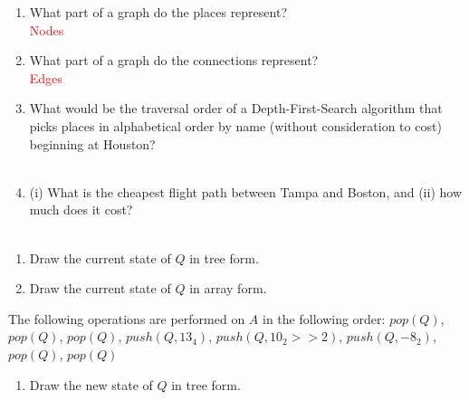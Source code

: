\documentclass[11pt,addpoints]{exam}
\begin{document}
\begin{questions}
\begin{enumerate}[label=(\Alph*)]
  \item What part of a graph do the places represent? \\

  \textcolor{red}{Nodes}

  \item What part of a graph do the connections represent? \\

  \textcolor{red}{Edges}

  \item What would be the traversal order of a Depth-First-Search algorithm that picks places in alphabetical order by name (without consideration to cost) beginning at Houston? \\ \\
  \item (i) What is the cheapest flight path between Tampa and Boston, and (ii) how much does it cost? \\ \\
\end{enumerate}

\newpage


\begin{enumerate}[label=(\Alph*)]
  \item Draw the current state of $Q$ in tree form.


  \item Draw the current state of $Q$ in array form.


\end{enumerate}

The following operations are performed on $A$ in the following order: $pop(Q)$, $pop(Q)$, $pop(Q)$, $push(Q, 13_{4})$, $push(Q, 10_{2} >> 2)$, $push(Q, -8_{2})$, $pop(Q)$, $pop(Q)$ \\

\begin{enumerate}[resume,label=(\Alph*)]
  \item Draw the new state of $Q$ in tree form.



\end{enumerate}
\end{questions}
\end{document}
